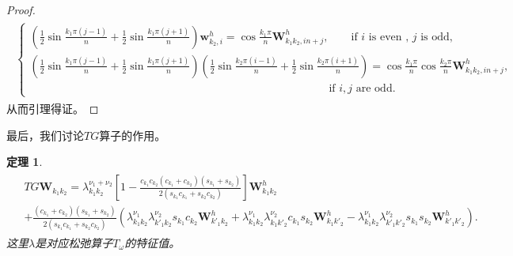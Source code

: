 \documentclass[a4paper,twoside]{ctexart}
\newtheorem{theorem}[definition]{定理}
\begin{document}
\begin{proof}
\begin{eqnarray}
\begin{aligned}
\begin{cases}
        (\frac{1}{2}\sin{\frac{k_1\pi(j-1)}{n}}+\frac{1}{2}\sin{\frac{k_1\pi(j+1)}{n}})\mathbf{w}_{k_2,i}^h =
        \cos{\frac{k_1\pi}{n}}\mathbf{W}_{k_1 k_2,in+j}^h,\qquad \text{if } i
          \text{ is even , }j\text{ is odd},\\
          (\frac{1}{2}\sin{\frac{k_1\pi(j-1)}{n}}+\frac{1}{2}\sin{\frac{k_1\pi(j+1)}{n}})(\frac{1}{2}\sin{\frac{k_2\pi(i-1)}{n}}+\frac{1}{2}\sin{\frac{k_2\pi(i+1)}{n}}) =
          \cos{\frac{k_1\pi}{n}}\cos{\frac{k_2\pi}{n}}\mathbf{W}_{k_1
            k_2,in+j}^h, \\ \qquad \qquad \qquad\qquad \quad \qquad\qquad \qquad \qquad \qquad \qquad\qquad \qquad \qquad  \text{if }i,j\text{ are odd}.
           \end{cases}
    \end{aligned}
     \end{eqnarray}
     从而引理得证。
   \end{proof}
   最后，我们讨论$TG$算子的作用。
   \begin{theorem}
     \begin{eqnarray}
        \begin{aligned}
       &TG\mathbf{W}_{k_1k_2} = \lambda_{k_1k_2}^{\nu_1+\nu_2}[1-\frac{c_{k_1}c_{k_2}(c_{k_1}+c_{k_2})(s_{k_1}+s_{k_2})}{2(s_{k_1}c_{k_1}+s_{k_2}c_{k_2})}]\mathbf{W}_{k_1
        k_2}^{h}\\
      &+\frac{(c_{k_1}+c_{k_2})(s_{k_1}+s_{k_2})}{2(s_{k_1}c_{k_1}+s_{k_2}c_{k_2})}\left(\lambda_{k_1k_2}^{\nu_1}\lambda_{k'_1k_2}^{\nu_2}s_{k_1}c_{k_2}\mathbf{W}_{k'_1
          k_2}^h+\lambda_{k_1k_2}^{\nu_1}\lambda_{k_1k'_2}^{\nu_2}c_{k_1}s_{k_2}\mathbf{W}_{k_1
          k'_2}^h-\lambda_{k_1k_2}^{\nu_1}\lambda_{k'_1k'_2}^{\nu_2}s_{k_1}s_{k_2}\mathbf{W}_{k'_1 k'_2}^h\right).
      \end{aligned}
     \end{eqnarray}
     这里$\lambda$是对应松弛算子$T_{\omega}$的特征值。
   \end{theorem}
\end{document}
